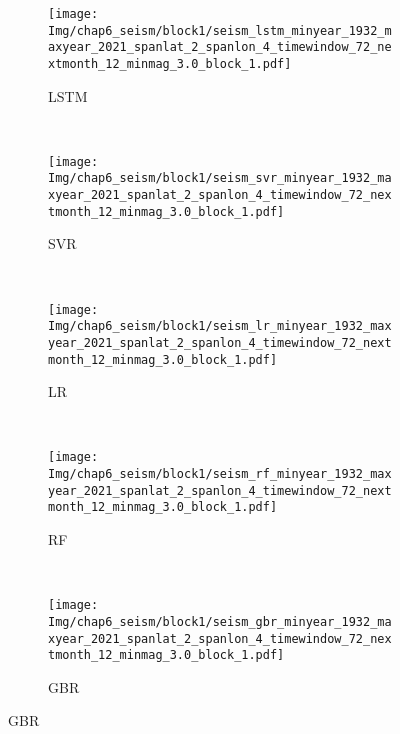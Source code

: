 \begin{figure}[!htbp]
  \vspace{-2cm}
  \centering
  \begin{subfigure}[b]{0.45\textwidth}
    \caption{LSTM}
    \texttt{[image: Img/chap6\_seism/block1/seism\_lstm\_minyear\_1932\_maxyear\_2021\_spanlat\_2\_spanlon\_4\_timewindow\_72\_nextmonth\_12\_minmag\_3.0\_block\_1.pdf]}
    \vspace{-1cm}
    \label{fig:seism_lstm_minyear_1932_maxyear_2021_spanlat_2_spanlon_4_timewindow_72_nextmonth_12_minmag_3.0_block_1}
  \end{subfigure}
  ~
  \begin{subfigure}[b]{0.45\textwidth}
    \caption{SVR} 
    \texttt{[image: Img/chap6\_seism/block1/seism\_svr\_minyear\_1932\_maxyear\_2021\_spanlat\_2\_spanlon\_4\_timewindow\_72\_nextmonth\_12\_minmag\_3.0\_block\_1.pdf]}
    \vspace{-1cm}
    \label{fig:seism_svr_minyear_1932_maxyear_2021_spanlat_2_spanlon_4_timewindow_72_nextmonth_12_minmag_3.0_block_1}
  \end{subfigure}   
  \\
  \begin{subfigure}[b]{0.45\textwidth}
      \caption{LR}
      \vspace{-0.2cm}
      \texttt{[image: Img/chap6\_seism/block1/seism\_lr\_minyear\_1932\_maxyear\_2021\_spanlat\_2\_spanlon\_4\_timewindow\_72\_nextmonth\_12\_minmag\_3.0\_block\_1.pdf]}
      \vspace{-1cm}
      \label{fig:seism_lr_minyear_1932_maxyear_2021_spanlat_2_spanlon_4_timewindow_72_nextmonth_12_minmag_3.0_block_1}
  \end{subfigure}
  ~
  \begin{subfigure}[b]{0.45\textwidth}
    \caption{RF}
    \vspace{-0.2cm}
    \texttt{[image: Img/chap6\_seism/block1/seism\_rf\_minyear\_1932\_maxyear\_2021\_spanlat\_2\_spanlon\_4\_timewindow\_72\_nextmonth\_12\_minmag\_3.0\_block\_1.pdf]}
    \vspace{-1cm}
    \label{fig:seism_rf_minyear_1932_maxyear_2021_spanlat_2_spanlon_4_timewindow_72_nextmonth_12_minmag_3.0_block_1}
  \end{subfigure}
  \\
  \begin{subfigure}[b]{0.45\textwidth}
    \caption{GBR}
    \vspace{-0.2cm}
    \texttt{[image: Img/chap6\_seism/block1/seism\_gbr\_minyear\_1932\_maxyear\_2021\_spanlat\_2\_spanlon\_4\_timewindow\_72\_nextmonth\_12\_minmag\_3.0\_block\_1.pdf]}

\end{subfigure}
\end{figure}
